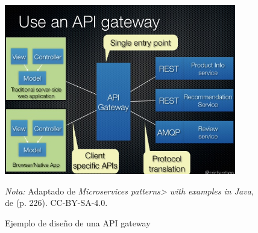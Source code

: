 \vspace{1em}
\begin{figure}[H]
  \caption{Ejemplo de diseño de una API gateway}
  \begin{center}
    \includegraphics[width=0.90\textwidth]{src/assets/metodologia/apigateway}
    \label{fig:api_gateway}
  \end{center}
  \textit{Nota:} Adaptado de \textit{Microservices patterns> with examples in Java}, de \cite{richardson2018microservices}
  (p. 226). CC-BY-SA-4.0.
\end{figure}

